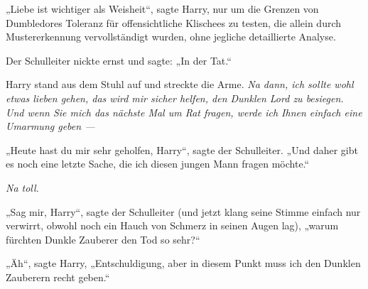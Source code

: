 „Liebe ist wichtiger als Weisheit“, sagte Harry, nur um die Grenzen von Dumbledores Toleranz für offensichtliche Klischees zu testen, die allein durch Mustererkennung vervollständigt wurden, ohne jegliche detaillierte Analyse.

Der Schulleiter nickte ernst und sagte: „In der Tat.“

Harry stand aus dem Stuhl auf und streckte die Arme. \emph{Na dann, ich sollte wohl etwas lieben gehen, das wird mir sicher helfen, den Dunklen Lord zu besiegen. Und wenn Sie mich das nächste Mal um Rat fragen, werde ich Ihnen einfach eine Umarmung geben —}

„Heute hast du mir sehr geholfen, Harry“, sagte der Schulleiter.
„Und daher gibt es noch eine letzte Sache, die ich diesen jungen Mann fragen möchte.“

\emph{Na toll.}

„Sag mir, Harry“, sagte der Schulleiter (und jetzt klang seine Stimme einfach nur verwirrt, obwohl noch ein Hauch von Schmerz in seinen Augen lag), „warum fürchten Dunkle Zauberer den Tod so sehr?“

„Äh“, sagte Harry,
„Entschuldigung, aber in diesem Punkt muss ich den Dunklen Zauberern recht geben.“